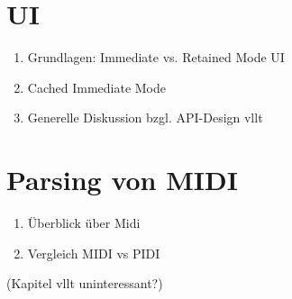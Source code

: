 \section{UI} \label{vorgehenSW-UI}
\begin{enumerate}
	\item Grundlagen: Immediate vs. Retained Mode UI
	\item Cached Immediate Mode
	\item Generelle Diskussion bzgl. API-Design vllt
\end{enumerate}

\section{Parsing von MIDI} \label{vorgehenSW-MIDI}
\begin{enumerate}
	\item Überblick über Midi
	\item Vergleich MIDI vs PIDI
\end{enumerate}
(Kapitel vllt uninteressant?)